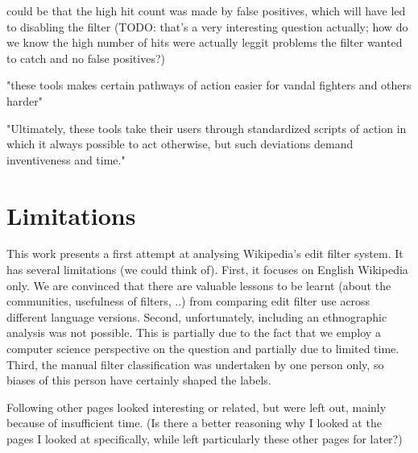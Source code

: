  could be that the high hit count was made by false positives, which will have led to disabling the filter (TODO: that's a very interesting question actually; how do we know the high number of hits were actually leggit problems the filter wanted to catch and no false positives?)

\cite{GeiRib2010}

"these tools makes certain pathways of action easier for vandal
fighters and others harder"

"Ultimately, these tools take their users
through standardized scripts of action in which it always
possible to act otherwise, but such deviations demand
inventiveness and time."


\section{Limitations}

This work presents a first attempt at analysing Wikipedia's edit filter system.
It has several limitations (we could think of).
First, it focuses on English Wikipedia only.
We are convinced that there are valuable lessons to be learnt (about the communities, usefulness of filters, ..) from comparing edit filter use across different language versions.
Second, unfortunately, including an ethnographic analysis was not possible.
This is partially due to the fact that we employ a computer science perspective on the question and partially due to limited time.
Third, the manual filter classification was undertaken by one person only, so biases of this person have certainly shaped the labels.


Following other pages looked interesting or related, but were left out, mainly because of insufficient time.
(Is there a better reasoning why I looked at the pages I looked at specifically, while left particularly these other pages for later?)

